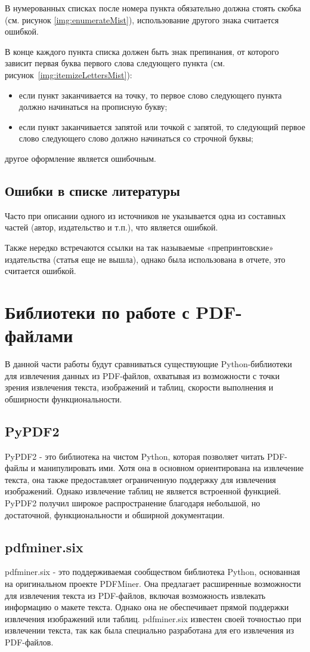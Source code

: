 В нумерованных списках после номера пункта обязательно должна стоять скобка (см. рисунок \ref{img:enumerateMist}), использование другого знака считается ошибкой.

В конце каждого пункта списка должен быть знак препинания, от которого зависит первая буква первого слова следующего пункта (см. рисунок~\ref{img:itemizeLettersMist}):
\begin{itemize}
	\item если пункт заканчивается на точку, то первое слово следующего пункта должно начинаться на прописную букву;
	\item если пункт заканчивается запятой или точкой с запятой, то следующий первое слово следующего слово должно начинаться со строчной буквы;
\end{itemize}
другое оформление является ошибочным.

\subsection{Ошибки в списке литературы}
Часто при описании одного из источников не указывается одна из составных частей (автор, издательство и т.п.), что является ошибкой.

Также нередко встречаются ссылки на так называемые «препринтовские» издательства (статья еще не вышла), однако была использована в отчете, это считается ошибкой.

\section{Библиотеки по работе с PDF-файлами}
В данной части работы будут сравниваться существующие Python-библиотеки для извлечения данных из PDF-файлов, охватывая из возможности с точки зрения извлечения текста, изображений и таблиц, скорости выполнения и обширности функциональности.
\subsection{PyPDF2}
PyPDF2 - это библиотека на чистом Python, которая позволяет читать PDF-файлы и манипулировать ими. Хотя она в основном ориентирована на извлечение текста, она также предоставляет ограниченную поддержку для извлечения изображений. Однако извлечение таблиц не является встроенной функцией. PyPDF2 получил широкое распространение благодаря небольшой, но достаточной, функциональности и обширной документации.
\subsection{pdfminer.six}
pdfminer.six - это поддерживаемая сообществом библиотека Python, основанная на оригинальном проекте PDFMiner. Она предлагает расширенные возможности для извлечения текста из PDF-файлов, включая возможность извлекать информацию о макете текста. Однако она не обеспечивает прямой поддержки извлечения изображений или таблиц. pdfminer.six известен своей точностью при извлечении текста, так как была специально разработана для его извлечения из PDF-файлов.
